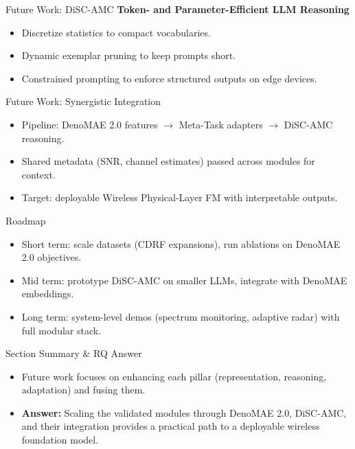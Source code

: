 \begin{frame}{Future Work: DiSC-AMC}
    \textbf{Token- and Parameter-Efficient LLM Reasoning}
    \begin{itemize}
        \item Discretize statistics to compact vocabularies.
        \item Dynamic exemplar pruning to keep prompts short.
        \item Constrained prompting to enforce structured outputs on edge devices.
    \end{itemize}
\end{frame}

\begin{frame}{Future Work: Synergistic Integration}
    \begin{itemize}
        \item Pipeline: DenoMAE 2.0 features $\rightarrow$ Meta-Task adapters $\rightarrow$ DiSC-AMC reasoning.
        \item Shared metadata (SNR, channel estimates) passed across modules for context.
        \item Target: deployable Wireless Physical-Layer FM with interpretable outputs.
    \end{itemize}
\end{frame}

\begin{frame}{Roadmap}
    \begin{itemize}
        \item Short term: scale datasets (CDRF expansions), run ablations on DenoMAE 2.0 objectives.
        \item Mid term: prototype DiSC-AMC on smaller LLMs, integrate with DenoMAE embeddings.
        \item Long term: system-level demos (spectrum monitoring, adaptive radar) with full modular stack.
    \end{itemize}
\end{frame}

\begin{frame}{Section Summary \& RQ Answer}
    \begin{itemize}
        \item Future work focuses on enhancing each pillar (representation, reasoning, adaptation) and fusing them.
        \item \textbf{Answer:} Scaling the validated modules through DenoMAE 2.0, DiSC-AMC, and their integration provides a practical path to a deployable wireless foundation model.
    \end{itemize}
\end{frame}

